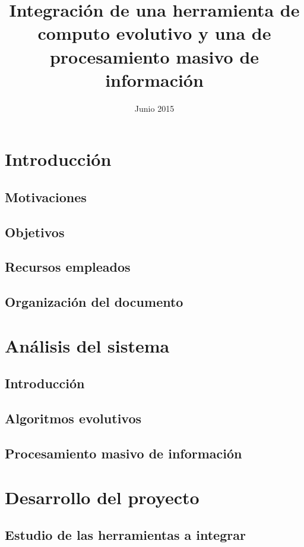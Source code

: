 \documentclass{memoriaPFC}
\title{Integración de una herramienta de computo evolutivo y una de procesamiento masivo de información}
\date{Junio 2015}
\begin{document}
\frontmatter
\hacerportada
\hacercontraportada
\newpage{\ }
\thispagestyle{empty} 
\hacerprologo
\haceragradecimientos
\setcounter{secnumdepth}{2}
\setcounter{tocdepth}{2}
\tableofcontents
\listoffigures
\listoftables

\mainmatter

\chapter{Introducci\'on}
	\section{Motivaciones}
		
	\section{Objetivos}
	\section{Recursos empleados}
	\section{Organizaci\'on del documento}

\chapter{An\'alisis del sistema}
	\section{Introducci\'on}
	\section{Algoritmos evolutivos}
		
	\section{Procesamiento masivo de informaci\'on}
		

\chapter{Desarrollo del proyecto}
	\section{Estudio de las herramientas a integrar}
\end{document}
